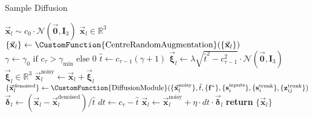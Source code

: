 \begin{algorithm}
    \caption{Sample Diffusion}
    {\small
    \begin{algorithmic}[1]
        \State $\vec{\mathbf{x}}_l \sim c_0 \cdot \mathcal{N}(\vec{\mathbf{0}}, \mathbf{I}_3)$ \hfill $\vec{\mathbf{x}}_l \in \mathbb{R}^3$
            \State $\{\vec{\mathbf{x}}_l\} \gets \CustomFunction{\text{CentreRandomAugmentation}}(\{\vec{\mathbf{x}}_l\})$
            \State $\gamma \gets \gamma_0 \text{ if } c_\tau > \gamma_{\min} \text{ else } 0$
            \State $\hat{t} \gets c_{\tau-1}(\gamma + 1)$
            \State $\vec{\boldsymbol{\xi}}_l \gets \lambda \sqrt{\hat{t}^2 - c_{\tau-1}^2} \cdot \mathcal{N}(\vec{\mathbf{0}}, \mathbf{I}_3)$ \hfill $\vec{\boldsymbol{\xi}}_l \in \mathbb{R}^3$
            \State $\vec{\mathbf{x}}_l^{\text{noisy}} \gets \vec{\mathbf{x}}_l + \vec{\boldsymbol{\xi}}_l$
            \State $\{\vec{\mathbf{x}}_l^{\text{denoised}}\} \gets \CustomFunction{\text{DiffusionModule}}(\{\vec{\mathbf{x}}_l^{\text{noisy}}\}, \hat{t}, \{\mathbf{f}^*\}, \{\mathbf{s}_i^{\text{inputs}}\}, \{\mathbf{s}_i^{\text{trunk}}\}, \{\mathbf{z}_{ij}^{\text{trunk}}\})$
            \State $\vec{\boldsymbol{\delta}}_l \gets (\vec{\mathbf{x}}_l - \vec{\mathbf{x}}_l^{\text{denoised}})/\hat{t}$
            \State $dt \gets c_\tau - \hat{t}$
            \State $\vec{\mathbf{x}}_l \gets \vec{\mathbf{x}}_l^{\text{noisy}} + \eta \cdot dt \cdot \vec{\boldsymbol{\delta}}_l$
        \EndFor
        \State \textbf{return} $\{\vec{\mathbf{x}}_l\}$
        \end{algorithmic}
    }
\end{algorithm}


